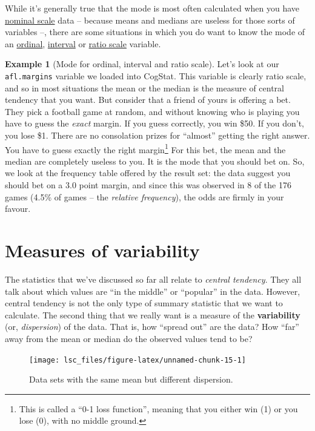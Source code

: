 \documentclass[
  11pt,
]{book}
\theoremstyle{definition}
\theoremstyle{definition}
\newtheorem{example}{Example}[chapter]
\theoremstyle{definition}
\theoremstyle{definition}
\theoremstyle{remark}
\begin{document}
While it's generally true that the mode is most often calculated when you have \protect\hyperlink{nominalscale}{nominal scale} data -- because means and medians are useless for those sorts of variables --, there are some situations in which you do want to know the mode of an \protect\hyperlink{ordinalscale}{ordinal}, \protect\hyperlink{intervalscale}{interval} or \protect\hyperlink{ratioscale}{ratio scale} variable.

\begin{example}[Mode for ordinal, interval and ratio scale]
\protect\hypertarget{exm:exmode2}{}\label{exm:exmode2}Let's look at our \texttt{afl.margins} variable we loaded into CogStat. This variable is clearly ratio scale, and so in most situations the mean or the median is the measure of central tendency that you want. But consider that a friend of yours is offering a bet. They pick a football game at random, and without knowing who is playing you have to guess the \emph{exact} margin. If you guess correctly, you win \$50. If you don't, you lose \$1. There are no consolation prizes for ``almost'' getting the right answer. You have to guess exactly the right margin\footnote{This is called a ``0-1 loss function'', meaning that you either win (1) or you lose (0), with no middle ground.} For this bet, the mean and the median are completely useless to you. It is the mode that you should bet on. So, we look at the frequency table offered by the result set: the data suggest you should bet on a \(3.0\) point margin, and since this was observed in 8 of the 176 games (4.5\% of games -- the \emph{relative frequency}), the odds are firmly in your favour.
\end{example}

\hypertarget{var}{%
\section{Measures of variability}\label{var}}

The statistics that we've discussed so far all relate to \emph{central tendency}. They all talk about which values are ``in the middle'' or ``popular'' in the data. However, central tendency is not the only type of summary statistic that we want to calculate. The second thing that we really want is a measure of the \textbf{variability} (or, \emph{dispersion}) of the data. That is, how ``spread out'' are the data? How ``far'' away from the mean or median do the observed values tend to be?

\begin{figure}

{\centering \texttt{[image: lsc\_files/figure-latex/unnamed-chunk-15-1]} 

}

\caption{Data sets with the same mean but different dispersion.}\label{fig:unnamed-chunk-15}
\end{figure}
\end{document}
